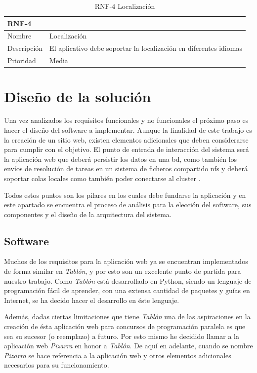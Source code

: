 \documentclass[11pt,spanish,listoffigures,listoftables]{tfgetsinf}
\begin{document}
\begin{table}
	\centering
	\begin{tabular}{ |p{4cm}||p{10cm}|  }
		\multicolumn{2}{l}{\textbf{RNF-4}} \\
		\hline
		Nombre   & Localización \\
		\hline
		Descripción  & El aplicativo debe soportar la localización en diferentes idiomas \\
		\hline
		Prioridad &  Media \\
		\hline
	\end{tabular}
	\caption{RNF-4 Localización}
	\label{table:27}
\end{table}



\chapter{Diseño de la solución}

Una vez analizados los requisitos funcionales y no funcionales el próximo paso es hacer el diseño del software a implementar. Aunque la finalidad de este trabajo es la creación de un sitio web, existen elementos adicionales que deben considerarse para cumplir con el objetivo. El punto de entrada de interacción del sistema será la aplicación web que deberá persistir los datos en una \acrshort{bd}, como también los envíos de resolución de \Gls{tarea}s en un sistema de ficheros compartido \acrshort{nfs} y deberá soportar \acrshort{cola}s locales como también poder conectarse al cluster \kahan. 


Todos estos puntos son los pilares en los cuales debe fundarse la aplicación y en este apartado se encuentra el proceso de análisis para la elección del software, sus componentes y el diseño de la arquitectura del sistema.

\section{Software}

Muchos de los requisitos para la aplicación web ya se encuentran implementados de forma similar en \textit{Tablón}, y por esto son un excelente punto de partida para nuestro trabajo. Como \textit{Tablón} está desarrollado en Python, siendo un lenguaje de programación fácil de aprender, con una extensa cantidad de \Gls{paquete}s y guías en Internet, se ha decido hacer el desarrollo en éste lenguaje.

Además, dadas ciertas limitaciones que tiene \textit{Tablón} una de las aspiraciones en la creación de ésta aplicación web para concursos de programación paralela es que sea su sucesor (o reemplazo) a futuro. Por esto mismo he decidido llamar a la aplicación web \textit{Pizarra} en honor a \textit{Tablón}. De aquí en adelante, cuando se nombre \textit{Pizarra} se hace referencia a la aplicación web y otros elementos adicionales necesarios para su funcionamiento. 
\end{document}
